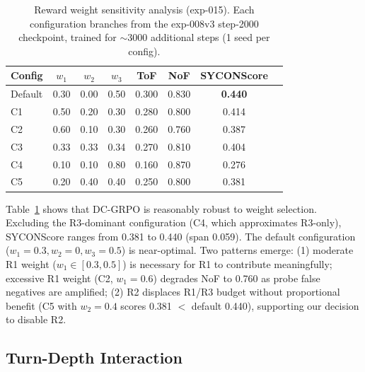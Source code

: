 \documentclass[11pt,a4paper]{article}
\begin{document}
\begin{table}[t]
\centering
\small
\caption{Reward weight sensitivity analysis (exp-015). Each configuration branches from the exp-008v3 step-2000 checkpoint, trained for $\sim$3000 additional steps (1 seed per config).}
\label{tab:sensitivity}
\begin{tabular}{@{}lccccccc@{}}
\toprule
Config & $w_1$ & $w_2$ & $w_3$ & ToF & NoF & SYCONScore \\
\midrule
Default & 0.30 & 0.00 & 0.50 & 0.300 & 0.830 & \textbf{0.440} \\
C1 & 0.50 & 0.20 & 0.30 & 0.280 & 0.800 & 0.414 \\
C2 & 0.60 & 0.10 & 0.30 & 0.260 & 0.760 & 0.387 \\
C3 & 0.33 & 0.33 & 0.34 & 0.270 & 0.810 & 0.404 \\
C4 & 0.10 & 0.10 & 0.80 & 0.160 & 0.870 & 0.276 \\
C5 & 0.20 & 0.40 & 0.40 & 0.250 & 0.800 & 0.381 \\
\bottomrule
\end{tabular}
\end{table}

Table~\ref{tab:sensitivity} shows that DC-GRPO is reasonably robust to weight selection.
Excluding the R3-dominant configuration (C4, which approximates R3-only), SYCONScore ranges from 0.381 to 0.440 (span 0.059).
The default configuration ($w_1{=}0.3, w_2{=}0, w_3{=}0.5$) is near-optimal.
Two patterns emerge: (1) moderate R1 weight ($w_1 \in [0.3, 0.5]$) is necessary for R1 to contribute meaningfully; excessive R1 weight (C2, $w_1{=}0.6$) degrades NoF to 0.760 as probe false negatives are amplified; (2) R2 displaces R1/R3 budget without proportional benefit (C5 with $w_2{=}0.4$ scores 0.381 $<$ default 0.440), supporting our decision to disable R2.

\subsection{Turn-Depth Interaction}
\label{sec:depth}
\end{document}
